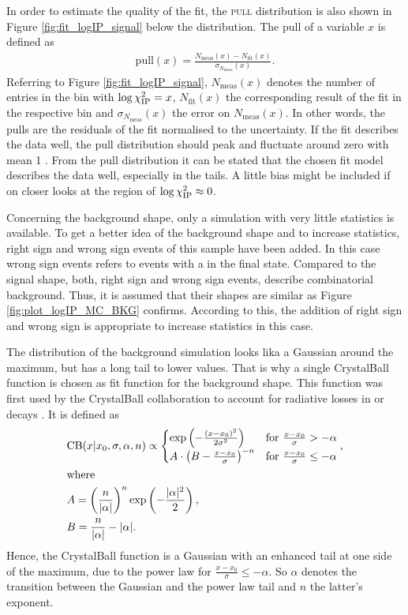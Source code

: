 In order to estimate the quality of the fit, the \textsc{pull} distribution is also shown in Figure \ref{fig:fit_logIP_signal} below the \logIP distribution.
The pull of a variable $x$ is defined as
\begin{align}
    \text{pull}(x) = \frac{N_\text{meas}(x)-N_\text{fit}(x)}{\sigma_{N_\text{meas}}(x)}.  \label{eq:pull}
\end{align}
Referring to Figure \ref{fig:fit_logIP_signal}, $N_\text{meas}(x)$ denotes the number of entries in the bin with $\log \chi^2_{\text{IP}} = x$, $N_\text{fit}(x)$ the corresponding result of the fit in the respective bin and $\sigma_{N_\text{meas}}(x)$ the error on $N_\text{meas}(x)$.
In other words, the pulls are the residuals of the fit normalised to the uncertainty.
If the fit describes the data well, the pull distribution should peak and fluctuate around zero with mean 1 \cite{Pulls}.
From the pull distribution it can be stated that the chosen fit model describes the data well, especially in the tails.
A little bias might be included if on closer looks at the region of $\log \chi^2_{\text{IP}} \approx 0$.

Concerning the \logIP background shape, only a simulation with very little statistics is available.
To get a better idea of the background \logIP shape and to increase statistics, right sign and wrong sign events of this sample have been added.
In this case wrong sign events refers to events with a \Lc\mup in the final state.
Compared to the signal \logIP shape, both, right sign and wrong sign events, describe combinatorial background.
Thus, it is assumed that their \logIP shapes are similar as Figure \ref{fig:plot_logIP_MC_BKG} confirms. 
According to this, the addition of right sign and wrong sign is appropriate to increase statistics in this case.

The \logIP distribution of the background simulation looks lika a Gaussian around the maximum, but has a long tail to lower \logIP values.
That is why a single CrystalBall function is chosen as fit function for the \logIP background shape. 
This function was first used by the CrystalBall collaboration to account for radiative losses in \jpsi or \psitwos decays \cite{CrystalBall}. 
It is defined as 
\begin{align}
    &\text{CB}(x|x_0, \sigma, \alpha, n) \propto
    \begin{cases}
        \exp \left(-\frac{(x-x_0)^2}{2\sigma^2}\right)     & \text{for } \frac{x-x_0}{\sigma} > -\alpha \\
        A \cdot \left(B - \frac{x-x_0}{\sigma}\right)^{-n} & \text{for } \frac{x-x_0}{\sigma} \leq -\alpha
    \end{cases}, \\
    &\text{where} \nonumber\\
    &A = \left(\frac{n}{|\alpha|}\right)^n \exp\left(-\frac{|\alpha|^2}{2}\right), \\
    &B = \frac{n}{|\alpha|} - |\alpha|.
\end{align}
Hence, the CrystalBall function is a Gaussian with an enhanced tail at one side of the maximum, due to the power law for $\frac{x-x_0}{\sigma} \leq -\alpha$.
So $\alpha$ denotes the transition between the Gaussian and the power law tail and $n$ the latter's exponent.

